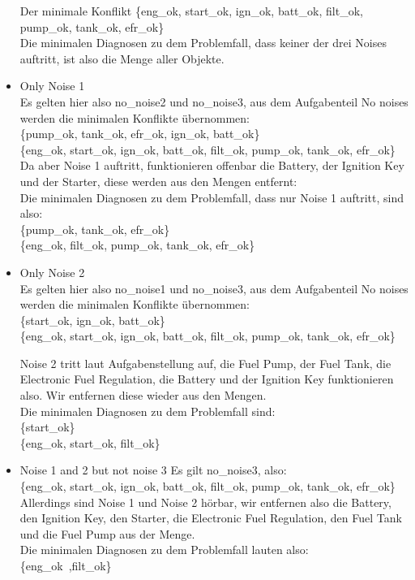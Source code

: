 \documentclass[ngerman]{fbi-aufgabenblatt}
\begin{document}
\begin{itemize}
Der minimale Konflikt \{eng\_ok, start\_ok, ign\_ok, batt\_ok, filt\_ok, pump\_ok, tank\_ok, efr\_ok\} \\

Die minimalen Diagnosen zu dem Problemfall, dass keiner der drei Noises auftritt, ist also die Menge aller Objekte. \\


\item Only Noise 1 \\
Es gelten hier also no\_noise2 und no\_noise3, aus dem Aufgabenteil \glqq No noises\grqq{} werden die minimalen Konflikte übernommen: \\
\{pump\_ok, tank\_ok, efr\_ok, ign\_ok, batt\_ok\} \\
\{eng\_ok, start\_ok, ign\_ok, batt\_ok, filt\_ok, pump\_ok, tank\_ok, efr\_ok\} \\

Da aber Noise 1 auftritt, funktionieren offenbar die Battery, der Ignition Key und der Starter, diese werden aus den Mengen entfernt: \\

Die minimalen Diagnosen zu dem Problemfall, dass nur Noise 1 auftritt, sind also: \\
\{pump\_ok, tank\_ok, efr\_ok\} \\
\{eng\_ok, filt\_ok, pump\_ok, tank\_ok, efr\_ok\} \\





\item Only Noise 2 \\
Es gelten hier also no\_noise1 und no\_noise3, aus dem Aufgabenteil \glqq No noises\grqq{} werden die minimalen Konflikte übernommen: \\
\{start\_ok, ign\_ok, batt\_ok\} \\
\{eng\_ok, start\_ok, ign\_ok, batt\_ok, filt\_ok, pump\_ok, tank\_ok, efr\_ok\}

Noise 2 tritt laut Aufgabenstellung auf, die Fuel Pump, der Fuel Tank, die Electronic Fuel Regulation, die Battery und der Ignition Key funktionieren also. Wir entfernen diese wieder aus den Mengen. \\

Die minimalen Diagnosen zu dem Problemfall sind: \\
\{start\_ok\} \\
\{eng\_ok, start\_ok, filt\_ok\}


\item Noise 1 and 2 but not noise 3
Es gilt no\_noise3, also: \\
\{eng\_ok, start\_ok, ign\_ok, batt\_ok, filt\_ok, pump\_ok, tank\_ok, efr\_ok\} \\

Allerdings sind Noise 1 und Noise 2 hörbar, wir entfernen also die Battery, den Ignition Key, den Starter, die Electronic Fuel Regulation, den Fuel Tank und die Fuel Pump aus der Menge. \\

Die minimalen Diagnosen zu dem Problemfall lauten also: \\
\{eng\_ok\ ,filt\_ok\}

\end{itemize}
\end{document}

